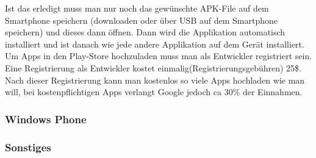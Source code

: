 Ist das erledigt muss man nur noch das gewünschte APK-File auf dem Smartphone speichern (downloaden oder über USB auf dem Smartphone speichern) und dieses dann öffnen. Dann wird die Applikation automatisch installiert und ist danach wie jede andere Applikation auf dem Gerät installiert.\\
 Um Apps in den Play-Store hochzuladen muss man als Entwickler registriert sein. Eine Registrierung als Entwickler kostet einmalig(Registrierungsgebühren) 25\$. Nach dieser Registrierung kann man kostenlos so viele Apps hochladen wie man will, bei kostenpflichtigen Apps verlangt Google jedoch ca 30\% der Einnahmen.\\



\subsubsection{Windows Phone}

\subsubsection{Sonstiges}
